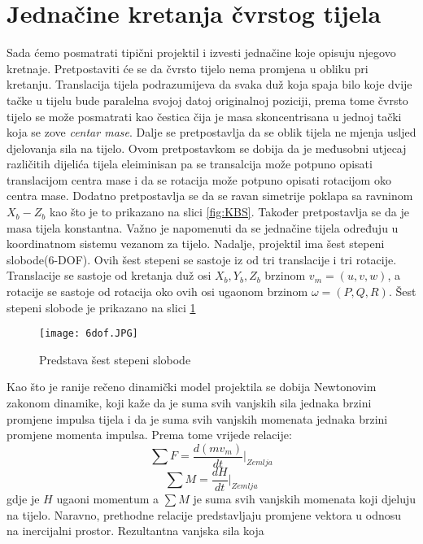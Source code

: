 \section{Jednačine kretanja čvrstog tijela}
Sada ćemo posmatrati tipični projektil i izvesti jednačine koje opisuju njegovo kretnaje.
Pretpostaviti će se da čvrsto tijelo nema promjena u obliku pri kretanju. Translacija tijela 
podrazumijeva da svaka duž koja spaja bilo koje dvije tačke u tijelu bude paralelna svojoj
datoj originalnoj poziciji, prema tome čvrsto tijelo se može posmatrati kao čestica čija je 
masa skoncentrisana u jednoj tački koja se zove \textit{centar mase}. Dalje se pretpostavlja 
da se oblik tijela ne mjenja usljed djelovanja sila na tijelo. Ovom pretpostavkom se 
dobija da je međusobni utjecaj različitih dijelića tijela eleiminisan pa se transalcija može potpuno opisati
translacijom centra mase i da se rotacija može potpuno opisati rotacijom oko centra mase. Dodatno 
pretpostavlja se da se ravan simetrije poklapa sa ravninom $X_b - Z_b$ kao što je to prikazano na 
slici \ref{fig:KBS}. Također pretpostavlja se da je masa tijela konstantna. Važno je 
napomenuti da se jednačine tijela određuju u koordinatnom sistemu vezanom za tijelo. 
Nadalje, projektil ima šest stepeni slobode(6-DOF). Ovih šest stepeni se sastoje iz od tri translacije i 
tri rotacije. Translacije se sastoje od kretanja duž osi $X_b,Y_b,Z_b$ brzinom $v_m=(u,v,w)$, a rotacije se sastoje 
od rotacija oko ovih osi ugaonom brzinom $\omega = (P,Q,R)$. Šest stepeni slobode je prikazano
na slici \ref{fig:dof} 
\begin{figure}
    \centering
    \texttt{[image: 6dof.JPG]}
    \caption{Predstava šest stepeni slobode}
    \label{fig:dof}
\end{figure}
Kao što je ranije rečeno dinamički model projektila se dobija Newtonovim zakonom dinamike,
koji kaže da je suma svih vanjskih sila jednaka brzini promjene impulsa tijela i da je 
suma svih vanjskih momenata jednaka brzini promjene momenta impulsa. Prema tome vrijede relacije:
\begin{equation}
    \sum F=\frac{d(mv_m)}{dt}|_{Zemlja}
    \label{eq:f}
\end{equation}
\begin{equation}
    \sum M=\frac{dH}{dt}|_{Zemlja}
    \label{eq:m}
\end{equation}
gdje je $H$ ugaoni momentum a $\sum M$ je suma svih vanjskih momenata koji djeluju na tijelo. Naravno, prethodne 
relacije predstavljaju promjene vektora u odnosu na inercijalni prostor. Rezultantna vanjska sila koja 
